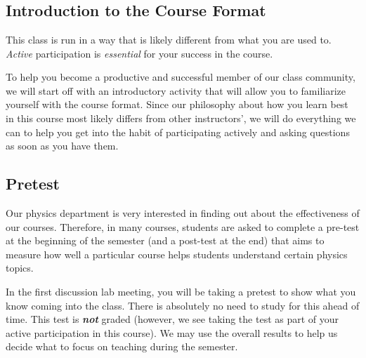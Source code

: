 \label{Unit0}

	
\chapter[\chaptername\thechapter]{\chapterlongname \thechapter}
	\section{Introduction to the Course Format}
		This class is run in a way that is likely different from what you are used to. {\em Active} participation is {\em essential} for your success in the course.
		
		To help you become a productive and successful member of our class community, we will start off with an introductory activity that will allow you to familiarize yourself with the course format. Since our philosophy about how you learn best in this course most likely differs from other instructors', we will do everything we can to help you get into the habit of participating actively and asking questions as soon as you have them.

	\section{Pretest}
		Our physics department is very interested in finding out about the effectiveness of our courses. Therefore, in many courses, students are asked to complete a pre-test at the beginning of the semester (and a post-test at the end) that aims to measure how well a particular course helps students understand certain physics topics.
		
		In the first discussion lab meeting, you will be taking a pretest to show what you know coming into the class. There is absolutely no need to study for this ahead of time. This test is \textbf{\emph{not}} graded (however, we see taking the test as part of your active participation in this course). We may use the overall results to help us decide what to focus on teaching during the semester.